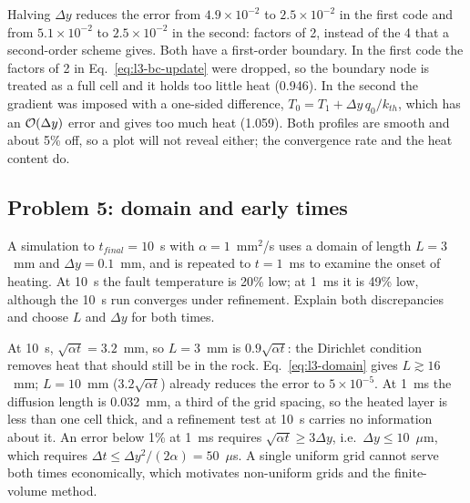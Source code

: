 \solution Halving $\Delta y$ reduces the error from $4.9\times10^{-2}$ to $2.5\times10^{-2}$ in the first code and from $5.1\times10^{-2}$ to $2.5\times10^{-2}$ in the second: factors of 2, instead of the 4 that a second-order scheme gives. Both have a first-order boundary. In the first code the factors of 2 in Eq.~\eqref{eq:l3-bc-update} were dropped, so the boundary node is treated as a full cell and it holds too little heat (0.946). In the second the gradient was imposed with a one-sided difference, $T_0=T_1+\Delta y\,q_0/k_{th}$, which has an $\mathcal{O}\!\left(\Delta y\right)$ error and gives too much heat (1.059). Both profiles are smooth and about 5\% off, so a plot will not reveal either; the convergence rate and the heat content do.

\subsection*{Problem 5: domain and early times}

A simulation to $t_{final}=10$~s with $\alpha=1$~mm$^2$/s uses a domain of length $L=3$~mm and $\Delta y=0.1$~mm, and is repeated to $t=1$~ms to examine the onset of heating. At 10~s the fault temperature is 20\% low; at 1~ms it is 49\% low, although the 10~s run converges under refinement. Explain both discrepancies and choose $L$ and $\Delta y$ for both times.

\solution At 10~s, $\sqrt{\alpha t}=3.2$~mm, so $L=3$~mm is $0.9\sqrt{\alpha t}$: the Dirichlet condition removes heat that should still be in the rock. Eq.~\eqref{eq:l3-domain} gives $L\gtrsim16$~mm; $L=10$~mm ($3.2\sqrt{\alpha t}$) already reduces the error to $5\times10^{-5}$. At 1~ms the diffusion length is 0.032~mm, a third of the grid spacing, so the heated layer is less than one cell thick, and a refinement test at 10~s carries no information about it. An error below 1\% at 1~ms requires $\sqrt{\alpha t}\ge3\Delta y$, i.e.\ $\Delta y\le10$~$\mu$m, which requires $\Delta t\le\Delta y^2/(2\alpha)=50$~$\mu$s. A single uniform grid cannot serve both times economically, which motivates non-uniform grids and the finite-volume method.